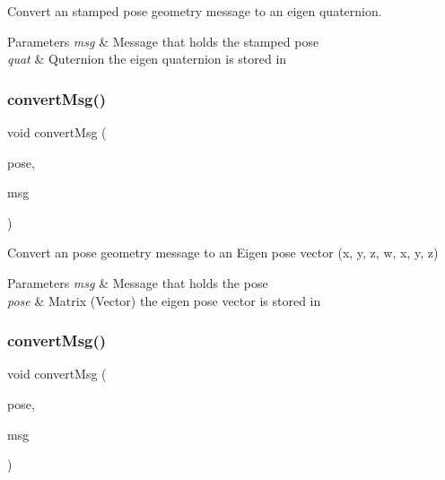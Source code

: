 Convert an stamped pose geometry message to an eigen quaternion. 


\begin{DoxyParams}{Parameters}
{\em msg} & Message that holds the stamped pose \\
\hline
{\em quat} & Quternion the eigen quaternion is stored in \\
\hline
\end{DoxyParams}
\mbox{\label{group__transport__controller_gafde5764b46f0189c2aea14ed57434708}} 
\subsubsection{\texorpdfstring{convert\+Msg()}{convertMsg()}\hspace{0.1cm}{\footnotesize\ttfamily [6/13]}}
{\footnotesize\ttfamily void convert\+Msg (\begin{DoxyParamCaption}\item[{Eigen\+::\+Matrix$<$ double, 7, 1 $>$ \&}]{pose,  }\item[{geometry\+\_\+msgs\+::\+Pose \&}]{msg }\end{DoxyParamCaption})}



Convert an pose geometry message to an Eigen pose vector (x, y, z, w, x, y, z) 


\begin{DoxyParams}{Parameters}
{\em msg} & Message that holds the pose \\
\hline
{\em pose} & Matrix (Vector) the eigen pose vector is stored in \\
\hline
\end{DoxyParams}
\mbox{\label{group__transport__controller_ga9e842115a5f448ab0e3ba9fea93d5179}} 
\subsubsection{\texorpdfstring{convert\+Msg()}{convertMsg()}\hspace{0.1cm}{\footnotesize\ttfamily [7/13]}}
{\footnotesize\ttfamily void convert\+Msg (\begin{DoxyParamCaption}\item[{Eigen\+::\+Matrix$<$ double, 7, 1 $>$ \&}]{pose,  }\item[{geometry\+\_\+msgs\+::\+Pose\+Stamped \&}]{msg }\end{DoxyParamCaption})}




